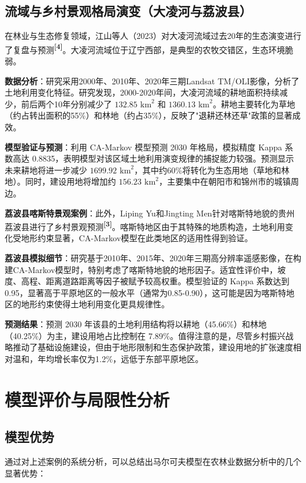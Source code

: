 \documentclass[a4paper,12pt]{ctexart}
\newcommand{\upcite}[1]{\textbf{\textsuperscript{[#1]}}}
\begin{document}
\subsection{流域与乡村景观格局演变（大凌河与荔波县）}

在林业与生态修复领域，江山等人（2023）对大凌河流域过去20年的生态演变进行了复盘与预测\upcite{4}。大凌河流域位于辽宁西部，是典型的农牧交错区，生态环境脆弱。

\textbf{数据分析}：研究采用2000年、2010年、2020年三期Landsat TM/OLI影像，分析了土地利用变化特征。研究发现，2000-2020年间，大凌河流域的耕地面积持续减少，前后两个10年分别减少了 $132.85 \text{ km}^2$ 和 $1360.13 \text{ km}^2$。耕地主要转化为草地（约占转出面积的55\%）和林地（约占35\%），反映了"退耕还林还草"政策的显著成效。

\textbf{模型验证与预测}：利用 CA-Markov 模型预测 2030 年格局，模拟精度 Kappa 系数高达 0.8835，表明模型对该区域土地利用演变规律的捕捉能力较强。预测显示未来耕地将进一步减少 $1699.92 \text{ km}^2$，其中约60\%将转化为生态用地（草地和林地）。同时，建设用地将增加约 $156.23 \text{ km}^2$，主要集中在朝阳市和锦州市的城镇周边。

\textbf{荔波县喀斯特景观案例}：此外，Liping Yu和Jingting Men针对喀斯特地貌的贵州荔波县进行了乡村景观预测\upcite{3}。喀斯特地区由于其特殊的地质构造，土地利用变化受地形约束显著，CA-Markov模型在此类地区的适用性得到验证。

\textbf{荔波县模拟细节}：研究基于2010年、2015年、2020年三期高分辨率遥感影像，在构建CA-Markov模型时，特别考虑了喀斯特地貌的地形因子。适宜性评价中，坡度、高程、距离道路距离等因子被赋予较高权重。模型验证的 Kappa 系数达到 0.95，显著高于平原地区的一般水平（通常为0.85-0.90），这可能是因为喀斯特地区的地形约束使得土地利用变化更具规律性。

\textbf{预测结果}：预测 2030 年该县的土地利用结构将以耕地（45.66\%）和林地（40.25\%）为主，建设用地占比控制在 7.89\%。值得注意的是，尽管乡村振兴战略推动了基础设施建设，但由于地形限制和生态保护政策，建设用地的扩张速度相对温和，年均增长率仅为1.2\%，远低于东部平原地区。


\section{模型评价与局限性分析}

\subsection{模型优势}

通过对上述案例的系统分析，可以总结出马尔可夫模型在农林业数据分析中的几个显著优势：
\end{document}
